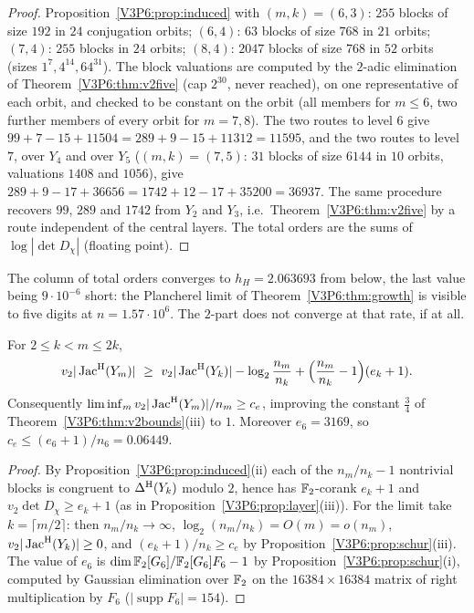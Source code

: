 \begin{proof}
Proposition~\ref{V3P6:prop:induced} with $(m,k)=(6,3)$: $255$ blocks of size $192$ in $24$
conjugation orbits; $(6,4)$: $63$ blocks of size $768$ in $21$ orbits; $(7,4)$: $255$ blocks in $24$
orbits; $(8,4)$: $2047$ blocks of size $768$ in $52$ orbits (sizes $1^{7},4^{14},64^{31}$). The
block valuations are computed by the $2$-adic elimination of Theorem~\ref{V3P6:thm:v2five} (cap
$2^{30}$, never reached), on one representative of each orbit, and checked to be constant on the
orbit (all members for $m\le6$, two further members of every orbit for $m=7,8$). The two routes to
level $6$ give $99+7-15+11504=289+9-15+11312=11595$, and the two routes to level $7$, over
$Y_4$ and over $Y_5$ ($(m,k)=(7,5)$: $31$ blocks of size $6144$ in $10$ orbits, valuations $1408$
and $1056$), give $289+9-17+36656=1742+12-17+35200=36937$. The same procedure recovers $99$, $289$
and $1742$ from $Y_2$ and $Y_3$, i.e.\ Theorem~\ref{V3P6:thm:v2five} by a route independent of the
central layers. The total orders are the sums of $\log|\det D_\chi|$ (floating point).
\end{proof}

The column of total orders converges to $h_H=2.063693$ from below, the last value being
$9\cdot10^{-6}$ short: the Plancherel limit of Theorem~\ref{V3P6:thm:growth} is visible to five
digits at $n=1.57\cdot10^{6}$. The $2$-part does not converge at that rate, if at all.

\begin{theorem}\label{V3P6:thm:v2sharp}
For $2\le k<m\le2k$,
\[
v_2|\JacH(Y_m)|\ \ge\ v_2|\JacH(Y_k)|-\log_2\frac{n_m}{n_k}+\Bigl(\frac{n_m}{n_k}-1\Bigr)(e_k+1).
\]
Consequently $\liminf_m v_2|\operatorname{Jac}^{\mathrm{H}}(Y_m)|/n_m\ge c_e$, improving the constant $\frac34$ of
Theorem~\ref{V3P6:thm:v2bounds}(iii) to $1$. Moreover $e_6=3169$, so
$c_e\le(e_6+1)/n_6=0.06449$.
\end{theorem}

\begin{proof}
By Proposition~\ref{V3P6:prop:induced}(ii) each of the $n_m/n_k-1$ nontrivial blocks is congruent
to $\Delta^{\mathrm{H}}(Y_k)$ modulo $2$, hence has $\mathbb{F}_2$-corank $e_k+1$ and $v_2\det D_\chi\ge e_k+1$ (as in
Proposition~\ref{V3P6:prop:layer}(iii)). For the limit take $k=\lceil m/2\rceil$: then
$n_m/n_k\to\infty$, $\log_2(n_m/n_k)=O(m)=o(n_m)$, $v_2|\operatorname{Jac}^{\mathrm{H}}(Y_k)|\ge0$, and
$(e_k+1)/n_k\ge c_e$ by Proposition~\ref{V3P6:prop:schur}(iii). The value of $e_6$ is
$\dim\mathbb{F}_2[G_6]/\mathbb{F}_2[G_6]F_6-1$ by Proposition~\ref{V3P6:prop:schur}(i), computed by Gaussian
elimination over $\mathbb{F}_2$ on the $16384\times16384$ matrix of right multiplication by $F_6$
($|\operatorname{supp}F_6|=154$).
\end{proof}

